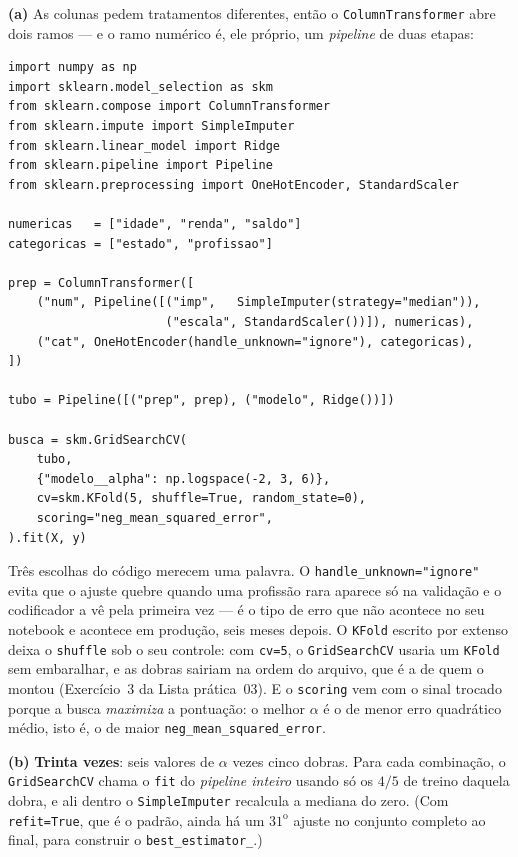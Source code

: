 \documentclass[11pt,a4paper]{article}
\begin{document}
\begin{solucao}
\textbf{(a)} As colunas pedem tratamentos diferentes, então o
\texttt{ColumnTransformer} abre dois ramos --- e o ramo numérico é, ele próprio,
um \emph{pipeline} de duas etapas:
\begin{lstlisting}
import numpy as np
import sklearn.model_selection as skm
from sklearn.compose import ColumnTransformer
from sklearn.impute import SimpleImputer
from sklearn.linear_model import Ridge
from sklearn.pipeline import Pipeline
from sklearn.preprocessing import OneHotEncoder, StandardScaler

numericas   = ["idade", "renda", "saldo"]
categoricas = ["estado", "profissao"]

prep = ColumnTransformer([
    ("num", Pipeline([("imp",   SimpleImputer(strategy="median")),
                      ("escala", StandardScaler())]), numericas),
    ("cat", OneHotEncoder(handle_unknown="ignore"), categoricas),
])

tubo = Pipeline([("prep", prep), ("modelo", Ridge())])

busca = skm.GridSearchCV(
    tubo,
    {"modelo__alpha": np.logspace(-2, 3, 6)},
    cv=skm.KFold(5, shuffle=True, random_state=0),
    scoring="neg_mean_squared_error",
).fit(X, y)
\end{lstlisting}

Três escolhas do código merecem uma palavra. O \texttt{handle\_unknown="ignore"}
evita que o ajuste quebre quando uma profissão rara aparece só na validação e o
codificador a vê pela primeira vez --- é o tipo de erro que não acontece no seu
notebook e acontece em produção, seis meses depois. O \texttt{KFold} escrito por
extenso deixa o \texttt{shuffle} sob o seu controle: com \texttt{cv=5}, o
\texttt{GridSearchCV} usaria um \texttt{KFold} sem embaralhar, e as dobras sairiam
na ordem do arquivo, que é a de quem o montou (Exercício~3 da Lista prática~03). E o
\texttt{scoring} vem com o sinal trocado porque a busca \emph{maximiza} a pontuação:
o melhor $\alpha$ é o de menor erro quadrático médio, isto é, o de maior
\texttt{neg\_mean\_squared\_error}.

\smallskip
\textbf{(b)} \textbf{Trinta vezes}: seis valores de $\alpha$ vezes cinco dobras. Para
cada combinação, o \texttt{GridSearchCV} chama o \texttt{fit} do \emph{pipeline
inteiro} usando só os $4/5$ de treino daquela dobra, e ali dentro o
\texttt{SimpleImputer} recalcula a mediana do zero. (Com \texttt{refit=True}, que
é o padrão, ainda há um $31^{\text{o}}$ ajuste no conjunto completo ao final, para
construir o \texttt{best\_estimator\_}.)


\end{solucao}
\end{document}
